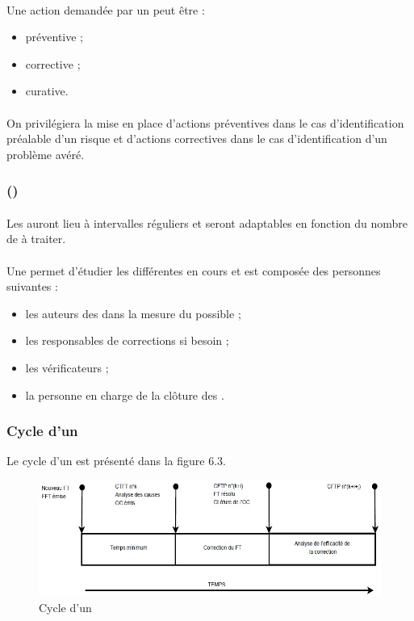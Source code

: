 \paragraph*{} Une action demandée par un \OCCourt{} peut être :
\begin{itemize}
\item préventive ;
\item corrective ;
\item curative.
\end{itemize}

\paragraph*{} On privilégiera la mise en place d'actions préventives dans le cas d'identification préalable
d'un risque et d'actions correctives dans le cas d'identification d'un problème avéré.


\subsubsection*{\CTFT (\CTFTCourt)}
\paragraph*{} Les \CTFTCourt{} auront lieu à intervalles réguliers et seront adaptables en fonction du nombre de \FTCourt{} à
traiter.

\paragraph*{} Une \CTFTCourt{} permet d'étudier les différentes \FTCourt{} en cours et est composée des personnes
suivantes :
\begin{itemize}
\item les auteurs des \FFTCourt{} dans la mesure du possible ;
\item les responsables de corrections si besoin ;
\item les vérificateurs ;
\item la personne en charge de la clôture des \OCCourt .
\end{itemize}

\subsubsection*{Cycle d'un \FTCourt}
Le cycle d'un \FTCourt{} est présenté dans la figure 6.3.

\begin{figure}[h]
   \center
   \caption{\label{Figure 6.1} Cycle d'un \FT}
   \includegraphics[width=13cm]{./images/cycle_d_un_fait_technique.jpg}
\end{figure}

